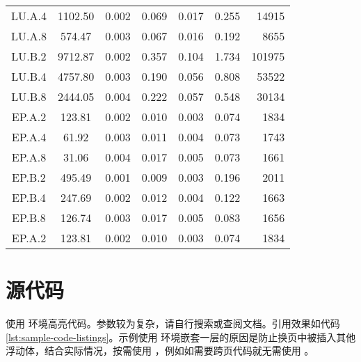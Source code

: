 \begin{longtable}[c]{ccccclr}
  LU.A.4 & 1102.50 & 0.002 & 0.069 & 0.017 & 0.255 & 14915 \\
  LU.A.8 & 574.47 & 0.003 & 0.067 & 0.016 & 0.192 & 8655 \\
  LU.B.2 & 9712.87 & 0.002 & 0.357 & 0.104 & 1.734 & 101975 \\
  LU.B.4 & 4757.80 & 0.003 & 0.190 & 0.056 & 0.808 & 53522 \\
  LU.B.8 & 2444.05 & 0.004 & 0.222 & 0.057 & 0.548 & 30134 \\
  EP.A.2 & 123.81 & 0.002 & 0.010 & 0.003 & 0.074 & 1834 \\
  EP.A.4 & 61.92 & 0.003 & 0.011 & 0.004 & 0.073 & 1743 \\
  EP.A.8 & 31.06 & 0.004 & 0.017 & 0.005 & 0.073 & 1661 \\
  EP.B.2 & 495.49 & 0.001 & 0.009 & 0.003 & 0.196 & 2011 \\
  EP.B.4 & 247.69 & 0.002 & 0.012 & 0.004 & 0.122 & 1663 \\
  EP.B.8 & 126.74 & 0.003 & 0.017 & 0.005 & 0.083 & 1656 \\
  EP.A.2 & 123.81 & 0.002 & 0.010 & 0.003 & 0.074 & 1834 \\
  \bottomrule[1.5pt]
\end{longtable}


\section{源代码}


使用  环境高亮代码。参数较为复杂，请自行搜索或查阅文档。引用效果如代码 \ref{lst:sample-code-listings}。示例使用  环境嵌套一层的原因是防止换页中被插入其他浮动体，结合实际情况，按需使用 ，例如如需要跨页代码就无需使用 。


